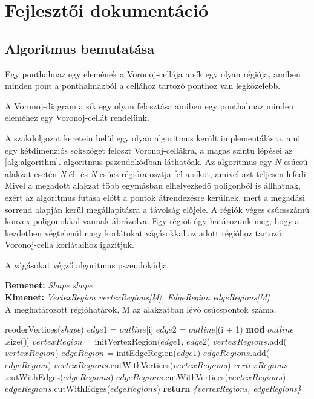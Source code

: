 \chapter{Fejlesztői dokumentáció}
\label{ch:impl}

\section{Algoritmus bemutatása}

\begin{definition}
	Egy ponthalmaz egy elemének a Voronoj-cellája a sík egy olyan régiója, amiben minden pont a ponthalmazból a cellához tartozó ponthoz van legközelebb.
\end{definition}

\begin{definition}
	A Voronoj-diagram a sík egy olyan felosztása amiben egy ponthalmaz minden eleméhez egy Voronoj-cellát rendelünk.
\end{definition}

A szakdolgozat keretein belül egy olyan algoritmus került implementálásra, ami egy kétdimenziós sokszöget feloszt Voronoj-cellákra, a magas szintű lépései az \ref{alg:algorithm}. algoritmus pszeudokódban láthatóak. Az algoritmus egy \textit{N} csúcsú alakzat esetén \textit{N} él- és \textit{N} csúcs régióra osztja fel a síkot, amivel azt teljesen lefedi. Mivel a megadott alakzat több egymásban elhelyezkedő poligonból is állhatnak, ezért az algoritmus futása előtt a pontok átrendezésre kerülnek, mert a megadási sorrend alapján kerül megállapításra a távolság előjele. A régiók véges csúcsszámú konvex poligonokkal vannak ábrázolva. Egy régiót úgy határozunk meg, hogy a kezdetben végtelenül nagy korlátokat vágásokkal az adott régióhoz tartozó Voronoj-cella korlátaihoz igazítjuk.

\begin{algorithm}[H]
	\caption{A vágásokat végző algoritmus pszeudokódja}
	\label{alg:algorithm}
	\textbf{Bemenet:} \textit{Shape shape} \\
	\textbf{Kimenet:} \textit{VertexRegion vertexRegions[M], EdgeRegion edgeRegions[M]}\\A meghatározott régióhatárok, M az alakzatban lévő csúcspontok száma.
	\begin{algorithmic}[1]
		\State reoderVertices(\textit{shape})
		\State $edge1$ = $outline$[i]
		\State $edge2$ = $outline$[(i + 1) \textbf{mod} $outline$.size()]
		\State $vertexRegion$ = initVertexRegion($edge1$, $edge2$)
		\State $vertexRegions$.add($vertexRegion$)
		\State $edgeRegion$ = initEdgeRegion($edge1$)
		\State $edgeRegions$.add($edgeRegion$)
		\EndFor
		\EndFor
		\State $vertexRegions$.cutWithVertices($vertexRegions$)
		\State $vertexRegions$.cutWithEdges($edgeRegions$)
		\State $edgeRegions$.cutWithVertices($vertexRegions$)
		\State $edgeRegions$.cutWithEdges($edgeRegions$)
		\State \textbf{return} \textit{\{vertexRegions, edgeRegions\}}
	\end{algorithmic}
\end{algorithm}

